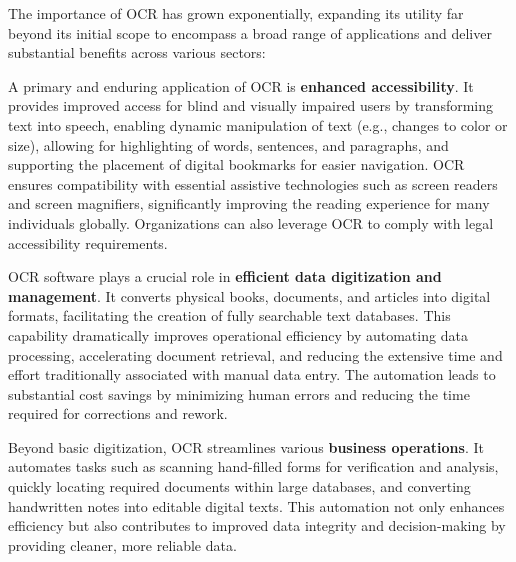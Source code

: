 The importance of OCR has grown exponentially, expanding its utility far beyond its initial scope to encompass a broad range of applications and deliver substantial benefits across various sectors:

A primary and enduring application of OCR is \textbf{enhanced accessibility}. It provides improved access for blind and visually impaired users by transforming text into speech, enabling dynamic manipulation of text (e.g., changes to color or size), allowing for highlighting of words, sentences, and paragraphs, and supporting the placement of digital bookmarks for easier navigation. OCR ensures compatibility with essential assistive technologies such as screen readers and screen magnifiers, significantly improving the reading experience for many individuals globally. Organizations can also leverage OCR to comply with legal accessibility requirements.

OCR software plays a crucial role in \textbf{efficient data digitization and management}. It converts physical books, documents, and articles into digital formats, facilitating the creation of fully searchable text databases. This capability dramatically improves operational efficiency by automating data processing, accelerating document retrieval, and reducing the extensive time and effort traditionally associated with manual data entry. The automation leads to substantial cost savings by minimizing human errors and reducing the time required for corrections and rework.

Beyond basic digitization, OCR streamlines various \textbf{business operations}. It automates tasks such as scanning hand-filled forms for verification and analysis, quickly locating required documents within large databases, and converting handwritten notes into editable digital texts. This automation not only enhances efficiency but also contributes to improved data integrity and decision-making by providing cleaner, more reliable data.

